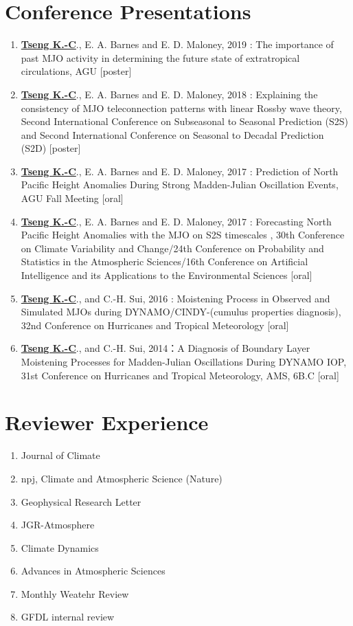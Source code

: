 \documentclass{article}
\begin{document}
\section{\color{airforceblue}Conference Presentations}
\begin{enumerate} 
	\item \normalsize{\bf{\underline{Tseng K.-C}}}., E. A. Barnes and E. D. Maloney, 2019 : The importance of past MJO activity in determining the future state of extratropical circulations, AGU [poster]
	\item \normalsize{\bf{\underline{Tseng K.-C}}}., E. A. Barnes and E. D. Maloney, 2018 : Explaining the consistency of MJO teleconnection patterns with linear Rossby wave theory, Second International Conference on Subseasonal to Seasonal Prediction (S2S) and Second International Conference on Seasonal to Decadal Prediction (S2D) [poster]
	\item \normalsize{\bf{\underline{Tseng K.-C}}}., E. A. Barnes and E. D. Maloney, 2017 : Prediction of North Pacific Height Anomalies During Strong Madden-Julian Oscillation Events, AGU Fall Meeting [oral]
	\item \normalsize{\bf{\underline{Tseng K.-C}}}., E. A. Barnes and E. D. Maloney, 2017 : Forecasting North Pacific Height Anomalies with the MJO on S2S timescales , 30th Conference on Climate Variability and Change/24th Conference on Probability and Statistics in the Atmospheric Sciences/16th Conference on Artificial Intelligence and its Applications to the Environmental Sciences [oral] 
	\item \normalsize{\bf{\underline{Tseng K.-C}}}., and C.-H. Sui, 2016 : Moistening Process in Observed and Simulated MJOs during DYNAMO/CINDY-(cumulus properties diagnosis), 32nd Conference on Hurricanes and Tropical Meteorology [oral] 
	\item \normalsize{\bf{\underline{Tseng K.-C}}}., and C.-H. Sui, 2014：A Diagnosis of Boundary Layer Moistening Processes for Madden-Julian Oscillations During DYNAMO IOP, 31st Conference on Hurricanes and Tropical Meteorology, AMS, 6B.C [oral] 
    \end{enumerate}


\section{\color{airforceblue}Reviewer Experience}
\begin{enumerate}
	\item Journal of Climate 
	\item npj, Climate and Atmospheric Science (Nature)
	\item Geophysical Research Letter
	\item JGR-Atmosphere
	\item Climate Dynamics
	\item Advances in Atmospheric Sciences
	\item Monthly Weatehr Review
	\item GFDL internal review
\end{enumerate}
\end{document}
